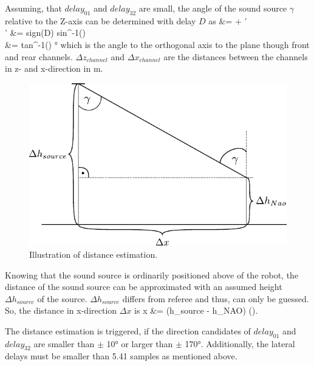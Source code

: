 Assuming, that $delay_{01}$ and $delay_{32}$ are small,
the angle of the sound source $\gamma$ relative
to the Z-axis can be determined with delay $D$ as
\bsub \bal
\gamma &= \alpha + \gamma'\\
\gamma' &= sign(D) \cdot sin^{-1}\left(\right)\\
\alpha &= tan^{-1}\left(\right) \si{\degree}
\eal \esub
which is the angle to the orthogonal axis to  the plane though
front and rear channels.
$\Delta z_{channel}$ and $\Delta x_{channel}$ are the distances between the channels
in z- and x-direction in \si{\meter}.
\begin{figure}[ht]
	\centering
		\includegraphics[width=0.6\columnwidth]{figures/x_distance}
	\caption{Illustration of distance estimation.}
    \label{fig:02_xDistance}
\end{figure}

Knowing that the sound source is ordinarily positioned above of the robot, the distance
of the sound source can be approximated with an assumed height $\Delta h_{source}$
of the source. $\Delta h_{source}$ differs from referee and thus, can only be guessed.
So, the distance in x-direction $\Delta x$ is
\bal
\Delta x &= (\Delta h_{source} - \Delta h_{NAO}) \cdot \tan(\gamma).
\label{eq:02_deltaX}
\eal

The distance estimation is triggered, if the direction candidates of
$delay_{01}$ and $delay_{32}$ are smaller than $\pm$ 10\si{\degree}
or larger than $\pm$ 170\si{\degree}.
Additionally, the lateral delays must be smaller than 5.41 samples as mentioned above.

